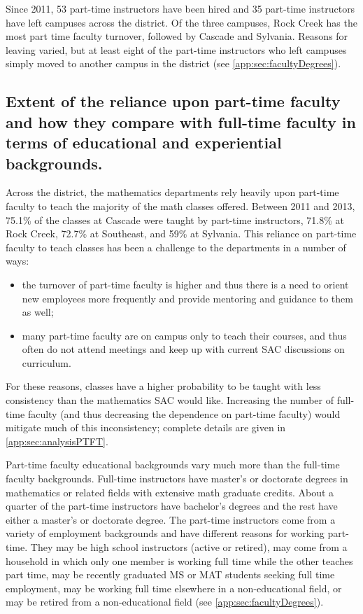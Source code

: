 Since 2011, 53 part-time instructors have been hired and 35 part-time
instructors have left campuses across the district.  Of the three campuses,
Rock Creek has the most part time faculty turnover, followed by Cascade and
Sylvania.  Reasons for leaving varied, but at least eight of the part-time
instructors who left campuses simply moved to another campus in the district
(see \vref{app:sec:facultyDegrees}).

\subsection{Extent of the reliance upon part-time faculty and how they compare
with full-time faculty in terms of educational and experiential backgrounds.}
Across the district, the mathematics departments rely heavily upon part-time
faculty to teach the majority of the math classes offered.  Between 2011 and
2013, 75.1\% of the classes at Cascade were taught by part-time instructors,
71.8\% at Rock Creek, 72.7\% at Southeast, and 59\% at Sylvania.  This reliance
on part-time faculty to teach classes has been a challenge to the departments
in a number of ways:  
\begin{itemize}
\item the turnover of part-time faculty is higher and
thus there is a need to orient new employees more frequently and provide
mentoring and guidance to them as well;
\item many part-time faculty are on
campus only to teach their courses, and thus often do not attend meetings and
keep up with current SAC discussions on curriculum.  
\end{itemize}
For these reasons, classes have a higher probability to be taught with less consistency than the
mathematics SAC would like.  Increasing the number of full-time faculty (and
thus decreasing the dependence on part-time faculty) would mitigate much of
this inconsistency; complete details are given in  \vref{app:sec:analysisPTFT}.

Part-time faculty educational backgrounds vary much more than the full-time
faculty backgrounds.  Full-time instructors have master's or doctorate degrees
in mathematics or related fields with extensive math graduate credits.  About a
quarter of the part-time instructors have bachelor's degrees and the rest have
either a master's or doctorate degree.  The part-time instructors come from a
variety of employment backgrounds and have different reasons for working
part-time.  They may be high school instructors (active or retired), may come
from a household in which only one member is working full time while the other
teaches part time, may be recently graduated MS or MAT students seeking full
time employment, may be working full time elsewhere in a non-educational field,
or may be retired from a non-educational field (see
\vref{app:sec:facultyDegrees}).

